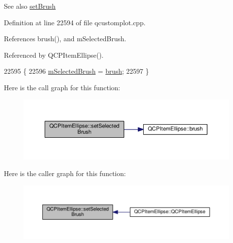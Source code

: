 \begin{DoxySeeAlso}{See also}
\hyperlink{class_q_c_p_item_ellipse_a49fc74e6965834e873d027d026def798}{set\+Brush} 
\end{DoxySeeAlso}


Definition at line 22594 of file qcustomplot.\+cpp.



References brush(), and m\+Selected\+Brush.



Referenced by Q\+C\+P\+Item\+Ellipse().


\begin{DoxyCode}
22595 \{
22596   \hyperlink{class_q_c_p_item_ellipse_a2e49d5547478aa36910ed8a2dcc8a5c0}{mSelectedBrush} = \hyperlink{class_q_c_p_item_ellipse_ac012e4fd59fdb1afb6554937bae8f7e1}{brush};
22597 \}
\end{DoxyCode}


Here is the call graph for this function\+:\nopagebreak
\begin{figure}[H]
\begin{center}
\leavevmode
\includegraphics[width=350pt]{class_q_c_p_item_ellipse_a9693501cfaa43a099655c75bed0dab3f_cgraph}
\end{center}
\end{figure}




Here is the caller graph for this function\+:\nopagebreak
\begin{figure}[H]
\begin{center}
\leavevmode
\includegraphics[width=350pt]{class_q_c_p_item_ellipse_a9693501cfaa43a099655c75bed0dab3f_icgraph}
\end{center}
\end{figure}


\hypertarget{class_q_c_p_item_ellipse_a6c542fba1dc918041c583f58a50dde99}{}
